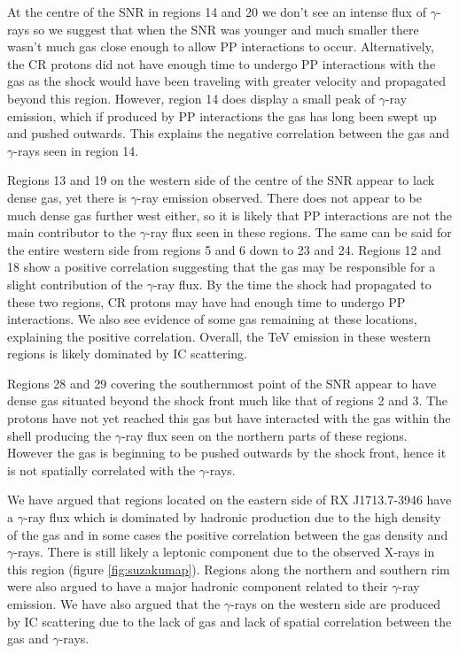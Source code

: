 \documentclass[12pt,a4paper]{article}
\begin{document}
At the centre of the SNR in regions 14 and 20 we don't see an intense flux of $\gamma$-rays so we suggest that when the SNR was younger and much smaller there wasn't much gas close enough to allow PP interactions to occur. Alternatively, the CR protons did not have enough time to undergo PP interactions with the gas as the shock would have been traveling with greater velocity and propagated beyond this region. However, region 14 does display a small peak of $\gamma$-ray emission, which if produced by PP interactions the gas has long been swept up and pushed outwards. This explains the negative correlation between the gas and $\gamma$-rays seen in region 14.

Regions 13 and 19 on the western side of the centre of the SNR appear to lack dense gas, yet there is $\gamma$-ray emission observed. There does not appear to be much dense gas further west either, so it is likely that PP interactions are not the main contributor to the $\gamma$-ray flux seen in these regions. The same can be said for the entire western side from regions 5 and 6 down to 23 and 24. Regions 12 and 18 show a positive correlation suggesting that the gas may be responsible for a slight contribution of the $\gamma$-ray flux. By the time the shock had propagated to these two regions, CR protons may have had enough time to undergo PP interactions. We also see evidence of some gas remaining at these locations, explaining the positive correlation. Overall, the TeV emission in these western regions is likely dominated by IC scattering. 

Regions 28 and 29 covering the southernmost point of the SNR appear to have dense gas situated beyond the shock front much like that of regions 2 and 3. The protons have not yet reached this gas but have interacted with the gas within the shell producing the $\gamma$-ray flux seen on the northern parts of these regions. However the gas is beginning to be pushed outwards by the shock front, hence it is not spatially correlated with the $\gamma$-rays. 

We have argued that regions located on the eastern side of RX J1713.7-3946 have a $\gamma$-ray flux which is dominated by hadronic production due to the high density of the gas and in some cases the positive correlation between the gas density and $\gamma$-rays. There is still likely a leptonic component due to the observed X-rays in this region (figure \ref{fig:suzakumap}). Regions along the northern and southern rim were also argued to have a major hadronic component related to their $\gamma$-ray emission. We have also argued that the $\gamma$-rays on the western side are produced by IC scattering due to the lack of gas and lack of spatial correlation between the gas and $\gamma$-rays. 
\end{document}
